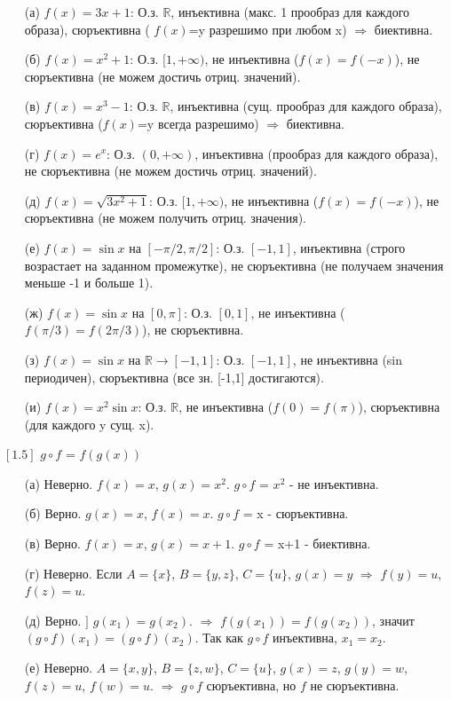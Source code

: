 \documentclass{article}
\begin{document}
\begin{solution}[1.4]
\begin{enumerate}
    \item[(а)] $f(x) = 3x + 1$: О.з. $\mathbb{R}$, инъективна (макс. 1 прообраз для каждого образа), сюръективна ( $f(x)$=y разрешимо при любом x) $\Rightarrow$ биективна.
    \item[(б)] $f(x) = x^2 + 1$: О.з. $[1, +\infty)$, не инъективна ($f(x)=f(-x)$), не сюръективна (не можем достичь отриц. значений).
    \item[(в)] $f(x) = x^3 - 1$: О.з. $\mathbb{R}$, инъективна (сущ. прообраз для каждого образа), сюръективна ($f(x)$=y всегда разрешимо) $\Rightarrow$ биективна.
    \item[(г)] $f(x) = e^x$: О.з. $(0, +\infty)$, инъективна (прообраз для каждого образа), не сюръективна (не можем достичь отриц. значений).
    \item[(д)] $f(x) = \sqrt{3x^2 + 1}$: О.з. $[1, +\infty)$, не инъективна ($f(x)=f(-x)$), не сюръективна (не можем получить отриц. значения).
    \item[(е)] $f(x) = \sin x$ на $[-\pi/2, \pi/2]$: О.з. $[-1, 1]$, инъективна (строго возрастает на заданном промежутке), не сюръективна (не получаем значения меньше -1 и больше 1).
    \item[(ж)] $f(x) = \sin x$ на $[0, \pi]$: О.з. $[0, 1]$, не инъективна ($f(\pi/3)=f(2\pi/3)$), не сюръективна.
    \item[(з)] $f(x) = \sin x$ на $\mathbb{R} \to [-1,1]$: О.з. $[-1,1]$, не инъективна (sin периодичен), сюръективна (все зн. [-1,1] достигаются).
    \item[(и)] $f(x) = x^2 \sin x$: О.з. $\mathbb{R}$, не инъективна ($f(0)=f(\pi)$), сюръективна (для каждого y сущ. x).
\end{enumerate}
\end{solution}

\begin{solution}$[1.5]$ $g\circ f$ = $f(g(x))$
\begin{enumerate}
    \item[(а)] {Неверно}. $f(x) = x$, $g(x) = x^2$. $g\circ f$ = $x^2$ - не инъективна.
    
    \item[(б)] {Верно}. $g(x) = x$, $f(x) = x$. $g\circ f$ = x - сюръективна.
    
    \item[(в)] {Верно}. $f(x) = x$, $g(x) = x+1$. $g\circ f$ = x+1 - биективна.
    
    \item[(г)] Неверно. Если $A = \{x\}$, $B = \{y,z\}$, $C = \{u\}$, $g(x) = y$ $\Rightarrow$ $f(y) = u$, $f(z) = u$.
    
    \item[(д)] Верно. $\rbrack$ $g(x_1) = g(x_2)$. $\Rightarrow$ $f(g(x_1)) = f(g(x_2))$, значит $(g\circ f)(x_1) = (g\circ f)(x_2)$. Так как $g\circ f$ инъективна, $x_1 = x_2$.

    
    \item[(е)] {Неверно}. $A = \{x,y\}$, $B = \{z,w\}$, $C = \{u\}$, $g(x)=z$, $g(y)=w$, $f(z)=u$, $f(w)=u$. $\Rightarrow$ $g\circ f$ сюръективна, но $f$ не сюръективна.
\end{enumerate}
\end{solution}
\end{document}

